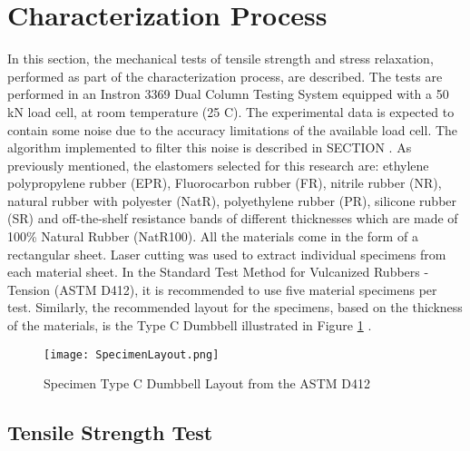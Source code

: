 \section{Characterization Process}
In this section, the mechanical tests of tensile strength and stress relaxation, performed as part of the characterization process, are described. The tests are performed in an Instron 3369 Dual Column Testing System equipped with a 50 kN load cell, at room temperature (25 \degree C). The experimental data is expected to contain some noise due to the accuracy limitations of the available load cell. The algorithm implemented to filter this noise is described in SECTION . As previously mentioned, the elastomers selected for this research are: ethylene polypropylene rubber (EPR), Fluorocarbon rubber (FR), nitrile rubber (NR), natural rubber with polyester (NatR),  polyethylene rubber (PR), silicone rubber (SR) and  off-the-shelf resistance bands of different thicknesses which are made of 100\% Natural Rubber (NatR100). All the materials come in the form of a rectangular sheet. Laser cutting was used to extract individual specimens from each material sheet. In the Standard Test Method for Vulcanized Rubbers - Tension (ASTM D412), it is recommended to use five material specimens per test. Similarly, the recommended layout for the specimens, based on the thickness of the materials, is the Type C Dumbbell illustrated in Figure \ref{fig:specimenLayout} \cite{astmd412}.

\begin{figure}[hb!]
    \centering
    \texttt{[image: SpecimenLayout.png]}
    \caption{Specimen Type C Dumbbell Layout from the ASTM D412 \cite{astmd412}}
    \label{fig:specimenLayout}
\end{figure}

\subsection{Tensile Strength Test}


